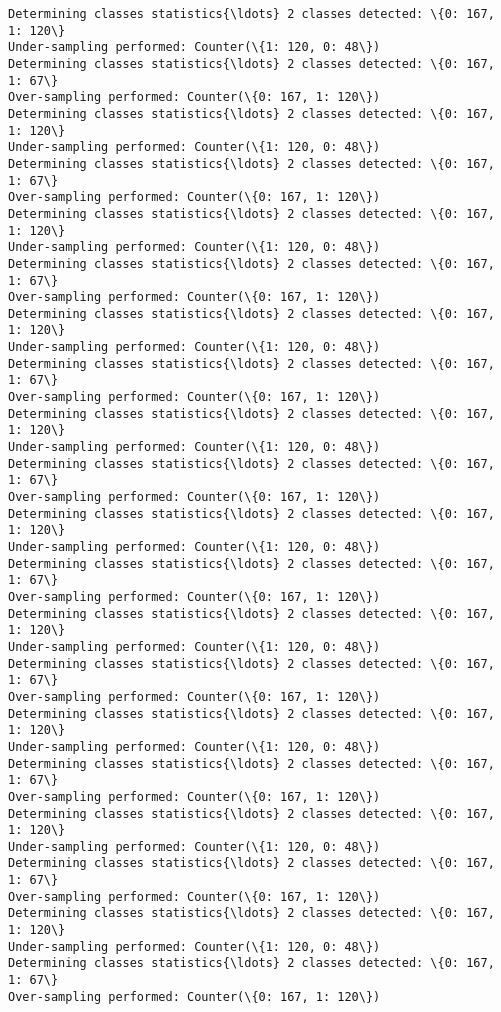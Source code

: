 \documentclass{article}
\begin{document}
\begin{Verbatim}[commandchars=\\\{\}]
Determining classes statistics{\ldots} 2 classes detected: \{0: 167, 1: 120\}
Under-sampling performed: Counter(\{1: 120, 0: 48\})
Determining classes statistics{\ldots} 2 classes detected: \{0: 167, 1: 67\}
Over-sampling performed: Counter(\{0: 167, 1: 120\})
Determining classes statistics{\ldots} 2 classes detected: \{0: 167, 1: 120\}
Under-sampling performed: Counter(\{1: 120, 0: 48\})
Determining classes statistics{\ldots} 2 classes detected: \{0: 167, 1: 67\}
Over-sampling performed: Counter(\{0: 167, 1: 120\})
Determining classes statistics{\ldots} 2 classes detected: \{0: 167, 1: 120\}
Under-sampling performed: Counter(\{1: 120, 0: 48\})
Determining classes statistics{\ldots} 2 classes detected: \{0: 167, 1: 67\}
Over-sampling performed: Counter(\{0: 167, 1: 120\})
Determining classes statistics{\ldots} 2 classes detected: \{0: 167, 1: 120\}
Under-sampling performed: Counter(\{1: 120, 0: 48\})
Determining classes statistics{\ldots} 2 classes detected: \{0: 167, 1: 67\}
Over-sampling performed: Counter(\{0: 167, 1: 120\})
Determining classes statistics{\ldots} 2 classes detected: \{0: 167, 1: 120\}
Under-sampling performed: Counter(\{1: 120, 0: 48\})
Determining classes statistics{\ldots} 2 classes detected: \{0: 167, 1: 67\}
Over-sampling performed: Counter(\{0: 167, 1: 120\})
Determining classes statistics{\ldots} 2 classes detected: \{0: 167, 1: 120\}
Under-sampling performed: Counter(\{1: 120, 0: 48\})
Determining classes statistics{\ldots} 2 classes detected: \{0: 167, 1: 67\}
Over-sampling performed: Counter(\{0: 167, 1: 120\})
Determining classes statistics{\ldots} 2 classes detected: \{0: 167, 1: 120\}
Under-sampling performed: Counter(\{1: 120, 0: 48\})
Determining classes statistics{\ldots} 2 classes detected: \{0: 167, 1: 67\}
Over-sampling performed: Counter(\{0: 167, 1: 120\})
Determining classes statistics{\ldots} 2 classes detected: \{0: 167, 1: 120\}
Under-sampling performed: Counter(\{1: 120, 0: 48\})
Determining classes statistics{\ldots} 2 classes detected: \{0: 167, 1: 67\}
Over-sampling performed: Counter(\{0: 167, 1: 120\})
Determining classes statistics{\ldots} 2 classes detected: \{0: 167, 1: 120\}
Under-sampling performed: Counter(\{1: 120, 0: 48\})
Determining classes statistics{\ldots} 2 classes detected: \{0: 167, 1: 67\}
Over-sampling performed: Counter(\{0: 167, 1: 120\})
Determining classes statistics{\ldots} 2 classes detected: \{0: 167, 1: 120\}
Under-sampling performed: Counter(\{1: 120, 0: 48\})
Determining classes statistics{\ldots} 2 classes detected: \{0: 167, 1: 67\}
Over-sampling performed: Counter(\{0: 167, 1: 120\})

\end{Verbatim}
\end{document}
